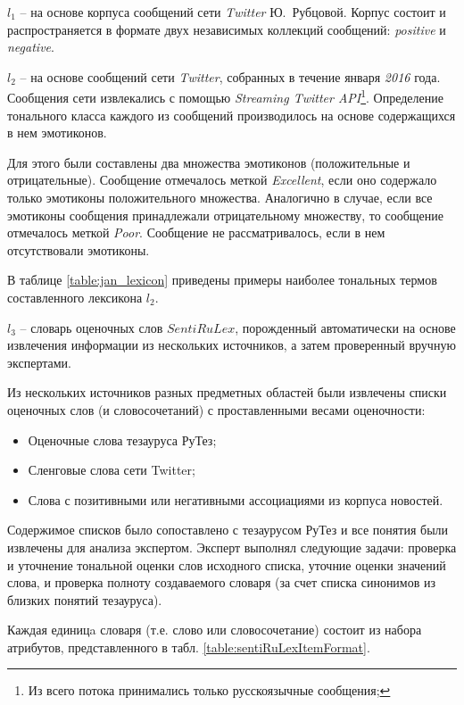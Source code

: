 $l_1$ -- на основе корпуса сообщений сети {\it Twitter} Ю.~Рубцовой.
Корпус состоит и распространяется в формате двух независимых коллекций
сообщений: {\it positive} и {\it negative}.

$l_2$ -- на основе сообщений сети {\it Twitter}, собранных в течение января {\it 2016} года.
Сообщения сети извлекались с помощью {\it Streaming Twitter API}\footnote{
    Из всего потока принимались только русскоязычные сообщения;
}.
Определение тонального класса каждого из сообщений производилось на
основе содержащихся в нем эмотиконов.

Для этого были составлены два множества эмотиконов (положительные и отрицательные).
Сообщение отмечалось меткой {\it Excellent}, если оно содержало
только эмотиконы положительного множества.
Аналогично в случае, если все эмотиконы сообщения принадлежали
отрицательному множеству, то сообщение отмечалось меткой {\it Poor}.
Сообщение не рассматривалось, если в нем отсутствовали эмотиконы.

В таблице \ref{table:jan_lexicon} приведены примеры наиболее тональных термов
составленного лексикона $l_2$.



$l_3$ -- словарь оценочных слов $SentiRuLex$, порожденный
автоматически на основе извлечения информации из нескольких источников,
а затем проверенный вручную экспертами.

Из нескольких источников разных предметных областей были
извлечены списки оценочных слов (и словосочетаний) с проставленными
весами оценочности:
\begin{itemize}
    \item Оценочные слова тезауруса РуТез;
    \item Сленговые слова сети Twitter;
    \item Слова с позитивными или негативными ассоциациями из корпуса новостей.
\end{itemize}
Содержимое списков было сопоставлено с тезаурусом РуТез и все понятия
были извлечены для анализа экспертом.
Эксперт выполнял следующие задачи:
проверка и уточнение тональной оценки слов исходного списка,
уточние оценки значений слова,
и проверка полноту создаваемого словаря (за счет списка синонимов из
близких понятий тезауруса).

Каждая единицa словаря (т.е. слово или словосочетание) состоит из набора
атрибутов, представленного в табл. \ref{table:sentiRuLexItemFormat}.




